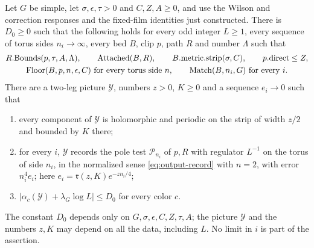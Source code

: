 \begin{proposition}
\label{prop:ex-annulus-estimate}
Let $G$ be simple, let $\sigma,\epsilon,\tau>0$ and $C,Z,A\geq0$, and
use the Wilson and correction responses and the fixed-film identities
just constructed. There is $D_0\geq0$ such that the
following holds for every odd integer $L\geq1$, every sequence of torus
sides $n_i\to\infty$, every bed $B$, clip $p$, path $R$ and number
$\Lambda$ such that
\begin{equation}\label{eq:ex-annulus-hypotheses}
\begin{gathered}
 R.\mathrm{Bounds}(p,\tau,A,\Lambda),\qquad
 \mathrm{Attached}(B,R),\qquad
 B.\mathrm{metric.strip}(\sigma,C),\qquad p.\mathrm{direct}\leq Z,\\
 \mathrm{Floor}(B,p,n,\epsilon,C)\ \hbox{for every torus side }n,
 \qquad \mathrm{Match}(B,n_i,G)\ \hbox{for every }i .
\end{gathered}
\end{equation}
There are a two-leg picture $\mathcal Y$, numbers $z>0$, $K\geq0$ and a
sequence $e_i\to0$ such that
\begin{enumerate}
\item every component of $\mathcal Y$ is holomorphic and periodic on the
 strip of width $z/2$ and bounded by $K$ there;
\item for every $i$, $\mathcal Y$ records the pole test
 $\mathcal P_{n_i}$ of $p,R$ with regulator $L^{-1}$ on the torus of
 side $n_i$, in the normalized sense \eqref{eq:output-record} with
 $n=2$, with error $n_i^4e_i$; here
 $e_i=\mathfrak r(z,K)e^{-zn_i/4}$;
\item $|\alpha_c(\mathcal Y)+\lambda_G\log L|\leq D_0$ for every color
 $c$.
\end{enumerate}
The constant $D_0$ depends only on $G,\sigma,\epsilon,C,Z,\tau,A$; the
picture $\mathcal Y$ and the numbers $z,K$ may depend on all the data,
including $L$. No limit in $i$ is part of the assertion.
\end{proposition}
